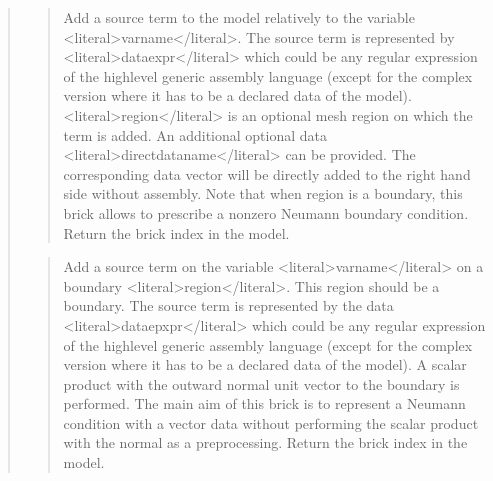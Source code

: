 \documentclass[a4paper,11pt,english]{sphinxmanual}
\begin{document}
\begin{quote}
\begin{quote}
\sphinxAtStartPar
Add a source term to the model relatively to the variable \textless{}literal\textgreater{}varname\textless{}/literal\textgreater{}.
The source term is
represented by \textless{}literal\textgreater{}dataexpr\textless{}/literal\textgreater{} which could be any regular expression of the
high\sphinxhyphen{}level generic assembly language (except for the complex version
where it has to be a declared data of the model).
\textless{}literal\textgreater{}region\textless{}/literal\textgreater{} is an optional mesh region
on which the term is added. An additional optional data \textless{}literal\textgreater{}directdataname\textless{}/literal\textgreater{}
can be provided. The corresponding data vector will be directly added
to the right hand side without assembly. Note that when region is a
boundary, this brick allows to prescribe a nonzero Neumann boundary
condition. Return the brick index in the model.
\end{quote}

\sphinxAtStartPar
{}
\begin{quote}

\sphinxAtStartPar
Add a source term on the variable \textless{}literal\textgreater{}varname\textless{}/literal\textgreater{} on a boundary \textless{}literal\textgreater{}region\textless{}/literal\textgreater{}.
This region should be a boundary. The source term is
represented by the data \textless{}literal\textgreater{}dataepxpr\textless{}/literal\textgreater{} which could be any regular
expression of the high\sphinxhyphen{}level generic assembly language (except
for the complex version where it has to be a declared data of
the model). A scalar
product with the outward normal unit vector to the boundary is performed.
The main aim of this brick is to represent a Neumann condition with a
vector data without performing the scalar product with the normal as a
pre\sphinxhyphen{}processing. Return the brick index in the model.
\end{quote}

\sphinxAtStartPar
{}
\begin{quote}


\end{quote}
\end{quote}
\end{document}
